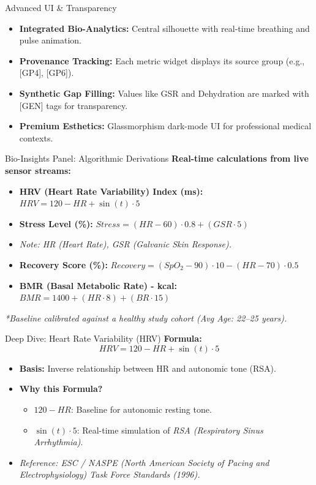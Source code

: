 \documentclass[aspectratio=169]{beamer}
\begin{document}
\begin{frame}{Advanced UI \& Transparency}
    \begin{itemize}
        \item \textbf{Integrated Bio-Analytics:} Central silhouette with real-time breathing and pulse animation.
        \item \textbf{Provenance Tracking:} Each metric widget displays its source group (e.g., [GP4], [GP6]).
        \item \textbf{Synthetic Gap Filling:} Values like GSR and Dehydration are marked with [GEN] tags for transparency.
        \item \textbf{Premium Esthetics:} Glassmorphism dark-mode UI for professional medical contexts.
    \end{itemize}
\end{frame}

\begin{frame}{Bio-Insights Panel: Algorithmic Derivations}
    \textbf{Real-time calculations from live sensor streams:}
    \vspace{0.5em}
    \begin{itemize}
        \item \textbf{HRV (Heart Rate Variability) Index (ms):} $HRV = 120 - HR + \sin(t) \cdot 5$
        \item \textbf{Stress Level (\%):} $Stress = (HR - 60) \cdot 0.8 + (GSR \cdot 5)$
        \item \textit{Note: HR (Heart Rate), GSR (Galvanic Skin Response).}
        \item \textbf{Recovery Score (\%):} $Recovery = (SpO_2 - 90) \cdot 10 - (HR - 70) \cdot 0.5$
        \item \textbf{BMR (Basal Metabolic Rate) - kcal:} $BMR = 1400 + (HR \cdot 8) + (BR \cdot 15)$
    \end{itemize}
    \vspace{0.5em}
    \centering \textit{*Baseline calibrated against a healthy study cohort (Avg Age: 22--25 years).}
\end{frame}

\begin{frame}{Deep Dive: Heart Rate Variability (HRV)}
    \textbf{Formula:} \[ HRV = 120 - HR + \sin(t) \cdot 5 \]
    \begin{itemize}
        \item \textbf{Basis:} Inverse relationship between HR and autonomic tone (RSA).
        \item \textbf{Why this Formula?}
              \begin{itemize}
                  \item $120 - HR$: Baseline for autonomic resting tone.
                  \item $\sin(t) \cdot 5$: Real-time simulation of \textit{RSA (Respiratory Sinus Arrhythmia)}.
              \end{itemize}
        \item \textit{Reference: ESC / NASPE (North American Society of Pacing and Electrophysiology) Task Force Standards (1996).}
    \end{itemize}
\end{frame}
\end{document}
